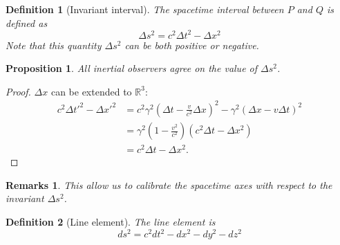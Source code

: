 \documentclass[a4paper]{article}
\newtheorem{defi}{Definition}[section]
\newtheorem{remarks}{Remarks}[section]
\newtheorem{prop}{Proposition}[section]
\theoremstyle{new}
\begin{document}
\begin{defi}[Invariant interval]
  The spacetime interval between $P$ and $Q$ is defined as
$$\Delta s^2 = c^2 \Delta t^2 - \Delta x^2$$
  Note that this quantity $\Delta s^2$ can be both positive or negative.
\end{defi}
\begin{prop}
  All inertial observers agree on the value of $\Delta s^2$.
\end{prop}
\begin{proof}
$\Delta x$ can be extended to $\mathbb{R}^3$:
\begin{align*}
    c^2 \Delta t'^2 - \Delta x'^2 &= c^2 \gamma^2 \left(\Delta t - \frac{v}{c^2}\Delta x\right)^2 - \gamma^2 (\Delta x - v\Delta t)^2\\
    &= \gamma^2 \left(1 - \frac{v^2}{c^2}\right)(c^2 \Delta t - \Delta x^2)\\
    &= c^2\Delta t - \Delta x^2. 
  \end{align*}
\end{proof}
\begin{remarks}
This allow us to calibrate the spacetime axes with respect to the invariant $\Delta s^2$.
\end{remarks}
\begin{defi}[Line element]
  The line element is
$$d s^2 = c^2 d t^2 - d x^2 - d y^2 - d z^2$$
\end{defi}
\end{document}
